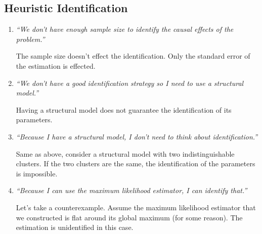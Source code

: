 \subsection{Heuristic Identification}

\begin{enumerate}
    \item \emph{“We don’t have enough sample size to identify the causal effects of the problem.”}

    The sample size doesn't effect the identification. Only the standard error of the estimation is effected.

    \item \emph{“We don’t have a good identification strategy so I need to use a structural model.”}
    
    Having a structural model does not guarantee the identification of its parameters.

    \item \emph{“Because I have a structural model, I don’t need to think about identification.”}
    
    Same as above, consider a structural model with two indistinguishable clusters. If the two clusters are the same, the identification of the parameters is impossible.

    \item \emph{“Because I can use the maximum likelihood estimator, I can identify that.”}
    
    Let's take a counterexample. Assume the maximum likelihood estimator that we constructed is flat around its global maximum (for some reason). The estimation is unidentified in this case.
\end{enumerate}